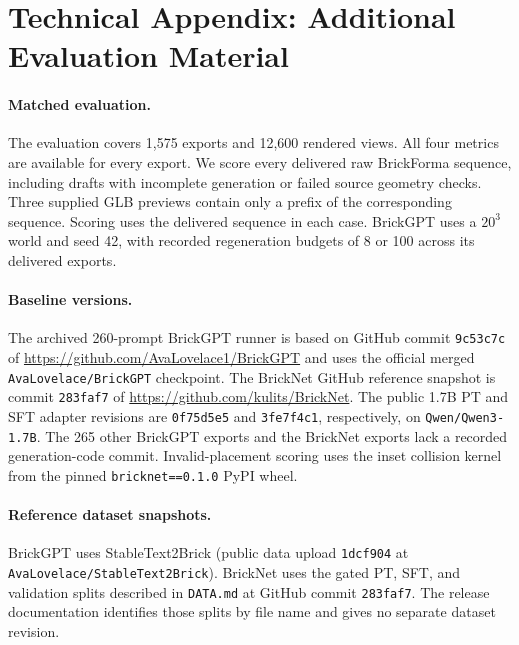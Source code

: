 \documentclass[letterpaper]{article} %
\begin{document}
\section{Technical Appendix: Additional Evaluation Material}
\label{app:eval}

\paragraph{Matched evaluation.}

The evaluation covers 1,575 exports and 12,600 rendered views. All four metrics are available for every export. We score every delivered raw BrickForma sequence, including drafts with incomplete generation or failed source geometry checks. Three supplied GLB previews contain only a prefix of the corresponding sequence. Scoring uses the delivered sequence in each case. BrickGPT uses a $20^3$ world and seed 42, with recorded regeneration budgets of 8 or 100 across its delivered exports.

\begin{samepage}
\paragraph{Baseline versions.} The archived 260-prompt BrickGPT runner is based on GitHub commit \texttt{9c53c7c} of \url{https://github.com/AvaLovelace1/BrickGPT} and uses the official merged \texttt{AvaLovelace/BrickGPT} checkpoint. The BrickNet GitHub reference snapshot is commit \texttt{283faf7} of \url{https://github.com/kulits/BrickNet}. The public 1.7B PT and SFT adapter revisions are \texttt{0f75d5e5} and \texttt{3fe7f4c1}, respectively, on \texttt{Qwen/Qwen3-1.7B}. The 265 other BrickGPT exports and the BrickNet exports lack a recorded generation-code commit. Invalid-placement scoring uses the inset collision kernel from the pinned \texttt{bricknet==0.1.0} PyPI wheel.

\paragraph{Reference dataset snapshots.} BrickGPT uses StableText2Brick (public data upload \texttt{1dcf904} at \texttt{AvaLovelace/StableText2Brick}). BrickNet uses the gated PT, SFT, and validation splits described in \texttt{DATA.md} at GitHub commit \texttt{283faf7}. The release documentation identifies those splits by file name and gives no separate dataset revision.
\end{samepage}
\end{document}
